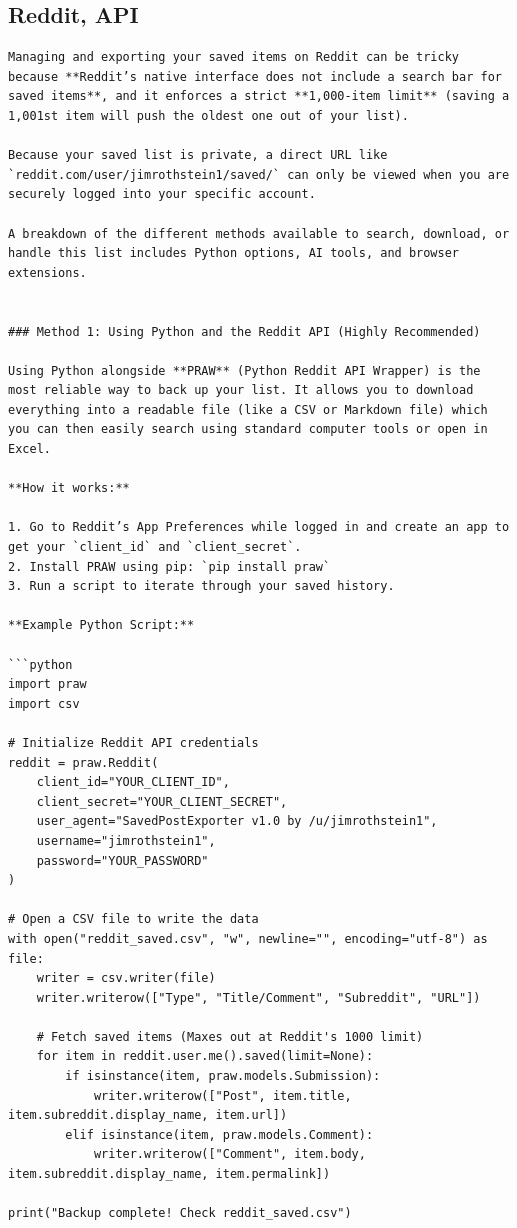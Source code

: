 \documentclass[
]{report}
\begin{document}
\subsection{Reddit, API}\label{reddit-api}

\begin{verbatim}
Managing and exporting your saved items on Reddit can be tricky because **Reddit’s native interface does not include a search bar for saved items**, and it enforces a strict **1,000-item limit** (saving a 1,001st item will push the oldest one out of your list).

Because your saved list is private, a direct URL like `reddit.com/user/jimrothstein1/saved/` can only be viewed when you are securely logged into your specific account.

A breakdown of the different methods available to search, download, or handle this list includes Python options, AI tools, and browser extensions.


### Method 1: Using Python and the Reddit API (Highly Recommended)

Using Python alongside **PRAW** (Python Reddit API Wrapper) is the most reliable way to back up your list. It allows you to download everything into a readable file (like a CSV or Markdown file) which you can then easily search using standard computer tools or open in Excel.

**How it works:**

1. Go to Reddit’s App Preferences while logged in and create an app to get your `client_id` and `client_secret`.
2. Install PRAW using pip: `pip install praw`
3. Run a script to iterate through your saved history.

**Example Python Script:**

```python
import praw
import csv

# Initialize Reddit API credentials
reddit = praw.Reddit(
    client_id="YOUR_CLIENT_ID",
    client_secret="YOUR_CLIENT_SECRET",
    user_agent="SavedPostExporter v1.0 by /u/jimrothstein1",
    username="jimrothstein1",
    password="YOUR_PASSWORD"
)

# Open a CSV file to write the data
with open("reddit_saved.csv", "w", newline="", encoding="utf-8") as file:
    writer = csv.writer(file)
    writer.writerow(["Type", "Title/Comment", "Subreddit", "URL"])

    # Fetch saved items (Maxes out at Reddit's 1000 limit)
    for item in reddit.user.me().saved(limit=None):
        if isinstance(item, praw.models.Submission):
            writer.writerow(["Post", item.title, item.subreddit.display_name, item.url])
        elif isinstance(item, praw.models.Comment):
            writer.writerow(["Comment", item.body, item.subreddit.display_name, item.permalink])

print("Backup complete! Check reddit_saved.csv")
\end{verbatim}
\end{document}
